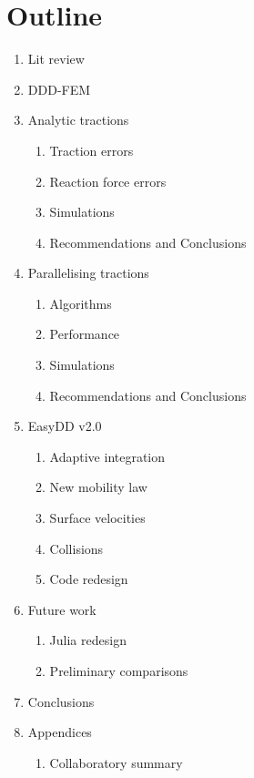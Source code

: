 \chapter*{Outline}
\begin{enumerate}
    \item Lit review
    \item DDD-FEM
    \item Analytic tractions
          \begin{enumerate}
              \item Traction errors
              \item Reaction force errors
              \item Simulations
              \item Recommendations and Conclusions
          \end{enumerate}
    \item Parallelising tractions
          \begin{enumerate}
              \item Algorithms
              \item Performance
              \item Simulations
              \item Recommendations and Conclusions
          \end{enumerate}
    \item EasyDD v2.0
          \begin{enumerate}
              \item Adaptive integration
              \item New mobility law
              \item Surface velocities
              \item Collisions
              \item Code redesign
          \end{enumerate}
    \item Future work
          \begin{enumerate}
              \item Julia redesign
              \item Preliminary comparisons
          \end{enumerate}
    \item Conclusions
    \item Appendices
          \begin{enumerate}
              \item Collaboratory summary
          \end{enumerate}
\end{enumerate}